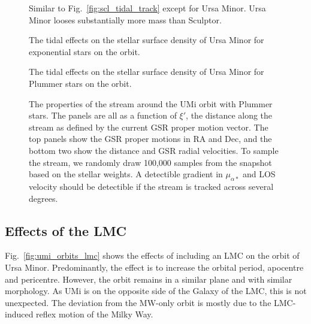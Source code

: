 \begin{figure}
\centering
{}
\caption[Ursa Minor tidal tracks]{Similar to
Fig.~\ref{fig:scl_tidal_track} except for Ursa Minor. Ursa Minor looses
substantially more mass than Sculptor.}\label{fig:umi_tidal_track}
\end{figure}

\begin{figure}
\centering
{}
\caption[Ursa Minor simulated density profiles]{The tidal effects on the
stellar surface density of Ursa Minor for exponential stars on the
\smallperi{} orbit.}\label{fig:umi_smallperi_i_f}
\end{figure}

\begin{figure}
\centering
{}
\caption[Ursa Minor Plummer model density]{The tidal effects on the
stellar surface density of Ursa Minor for Plummer stars on the
\smallperi{} orbit.}\label{fig:umi_plummer_i_f}
\end{figure}

\begin{figure}
\centering
{}
\caption[Ursa Minor predicted stream]{The properties of the stream
around the UMi \smallperi{} orbit with Plummer stars. The panels are all
as a function of \(\xi'\), the distance along the stream as defined by
the current GSR proper motion vector. The top panels show the GSR proper
motions in RA and Dec, and the bottom two show the distance and GSR
radial velocities. To sample the stream, we randomly draw 100,000
samples from the snapshot based on the stellar weights. A detectible
gradient in \(\mu_{\alpha*}\) and LOS velocity should be detectible if
the stream is tracked across several
degrees.}\label{fig:umi_tidal_stream}
\end{figure}

\subsection{Effects of the LMC}\label{effects-of-the-lmc}

Fig.~\ref{fig:umi_orbits_lmc} shows the effects of including an LMC on
the orbit of Ursa Minor. Predominantly, the effect is to increase the
orbital period, apocentre and pericentre. However, the orbit remains in
a similar plane and with similar morphology. As UMi is on the opposite
side of the Galaxy of the LMC, this is not unexpected. The deviation
from the MW-only orbit is mostly due to the LMC-induced reflex motion of
the Milky Way.

